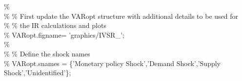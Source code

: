 \hspace{1mm}\hspace{5mm} \hspace{5mm} \hspace{5mm} \textcolor{matlabgreen}{\%  }\\ 
\hspace{1mm}\hspace{5mm} \hspace{5mm} \hspace{5mm} \textcolor{matlabgreen}{\% }\textcolor{matlabgreen}{\% First update the VARopt structure with additional details to be used \textcolor{matlabblue}{for} }\\ 
\hspace{1mm}\hspace{5mm} \hspace{5mm} \hspace{5mm} \hspace{5mm} \textcolor{matlabgreen}{\% }\textcolor{matlabgreen}{\% the IR calculations and plots }\\ 
\hspace{1mm}\hspace{5mm} \hspace{5mm} \hspace{5mm} \hspace{5mm} \textcolor{matlabgreen}{\% VARopt.figname= 'graphics/IVSR\_'; }\\ 
\hspace{1mm}\hspace{5mm} \hspace{5mm} \hspace{5mm} \hspace{5mm} \textcolor{matlabgreen}{\%  }\\ 
\hspace{1mm}\hspace{5mm} \hspace{5mm} \hspace{5mm} \hspace{5mm} \textcolor{matlabgreen}{\% }\textcolor{matlabgreen}{\% Define the shock names }\\ 
\hspace{1mm}\hspace{5mm} \hspace{5mm} \hspace{5mm} \hspace{5mm} \textcolor{matlabgreen}{\% VARopt.snames = \{'Monetary policy Shock','Demand Shock','Supply Shock','Unidentified'\}; }\\ 
